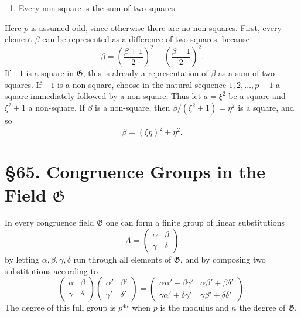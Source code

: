 \documentclass[11pt,a4paper]{book}
\newcommand{\webersection}[2]{\clearpage\section*{\S #1. #2}}
\begin{document}
\begin{enumerate}[label=\arabic*.,resume]
\item Every non-square is the sum of two squares.
\end{enumerate}
Here \(p\) is assumed odd, since otherwise there are no non-squares.  First, every element \(\beta\) can be represented as a difference of two squares, because
\[
 \beta=\left(\frac{\beta+1}{2}\right)^2-\left(\frac{\beta-1}{2}\right)^2.
\]
If \(-1\) is a square in \(\mathfrak G\), this is already a representation of \(\beta\) as a sum of two squares.  If \(-1\) is a non-square, choose in the natural sequence \(1,2,\ldots,p-1\) a square immediately followed by a non-square.  Thus let \(a=\xi^2\) be a square and \(\xi^2+1\) a non-square.  If \(\beta\) is a non-square, then \(\beta/(\xi^2+1)=\eta^2\) is a square, and so
\[
 \beta=(\xi\eta)^2+\eta^2.
\]

\webersection{65}{Congruence Groups in the Field \(\mathfrak G\)}

In every congruence field \(\mathfrak G\) one can form a finite group of linear substitutions
\begin{equation}\label{eq:65-1}
 A=\begin{pmatrix}\alpha&\beta\\ \gamma&\delta\end{pmatrix}
\end{equation}
by letting \(\alpha,\beta,\gamma,\delta\) run through all elements of \(\mathfrak G\), and by composing two substitutions according to
\begin{equation}\label{eq:65-2}
 \begin{pmatrix}\alpha&\beta\\\gamma&\delta\end{pmatrix}
 \begin{pmatrix}\alpha'&\beta'\\\gamma'&\delta'\end{pmatrix}
 =
 \begin{pmatrix}
 \alpha\alpha'+\beta\gamma'&\alpha\beta'+\beta\delta'\\
 \gamma\alpha'+\delta\gamma'&\gamma\beta'+\delta\delta'
 \end{pmatrix}.
\end{equation}
The degree of this full group is \(p^{4n}\) when \(p\) is the modulus and \(n\) the degree of \(\mathfrak G\).
\end{document}
